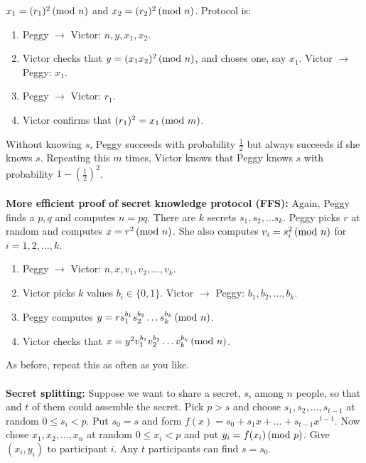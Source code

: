 $x_1 = (r_1)^2 \thinspace \textnormal{(mod } n \textnormal{)}$ and $x_2 = (r_2)^2 \thinspace \textnormal{(mod } n \textnormal{)}$.  Protocol is:
\begin{enumerate}
\item Peggy $\rightarrow$ Victor: $n, y, x_1, x_2$.
\item Victor checks that $y= (x_1 x_2)^2 \thinspace \textnormal{(mod } n \textnormal{)}$, and choses one, say $x_1$. Victor $\rightarrow$ Peggy: $x_1$.
\item Peggy $\rightarrow$ Victor: $r_1$.
\item Victor confirms that  $(r_1)^2 = x_1 \thinspace \textnormal{(mod } m \textnormal{)}$.
\end{enumerate}
Without knowing $s$, Peggy succeeds with probability ${\frac 1 2}$ but always succeeds if she knows $s$.  Repeating this
$m$ times, Victor knows that Peggy knows $s$ with probability $1-({\frac 1 2})^2$.
\\
\\
{\bf More efficient proof of secret knowledge protocol (FFS):} 
Again, Peggy finds a $p, q$ and computes $n=pq$.  There are $k$ secrets $s_1, s_2, \ldots s_k$. Peggy picks $r$ at
random and computes $x = r^2 \thinspace \textnormal{(mod } n \textnormal{)}$.  She also computes $v_i = s_i^2 \thinspace \textnormal{(mod } n \textnormal{)}$ for $i=1,2, \ldots, k$.
\begin{enumerate}
\item Peggy $\rightarrow$ Victor: $n, x, v_1, v_2 , \ldots, v_k$.
\item Victor picks $k$ values $b_i \in \{0, 1\}$.  Victor $\rightarrow$ Peggy: $b_1, b_2, \ldots, b_k$.
\item Peggy computes $y = r s_1^{b_1} s_2^{b_2} \ldots s_k^{b_k} \thinspace \textnormal{(mod } n \textnormal{)}$.
\item Victor checks that $x = y^2 v_1^{b_1} v_2^{b_2} \ldots v_k^{b_k} \thinspace \textnormal{(mod } n \textnormal{)}$.
\end{enumerate}
As before, repeat this as often as you like.
\\
\\
{\bf Secret splitting:} Suppose we want to share a secret, $s$, among $n$ people, so that and $t$ of them could assemble
the secret. Pick $p >s$ and choose $s_1, s_2, \ldots, s_{t-1}$ at random $0 \leq s_i < p$.  Put $s_0 = s$ and form
$f(x)= s_0 + s_1x + \ldots + s_{t-1}x^{t-1}$. Now chose $x_1, x_2, \ldots, x_{n}$ at random $0 \leq x_i < p$ and put
$y_i = f(x_i ) \thinspace \textnormal{(mod } p \textnormal{)}$.  Give $(x_i , y_i )$ to participant $i$.  Any $t$ participants can find $s=s_0$.
